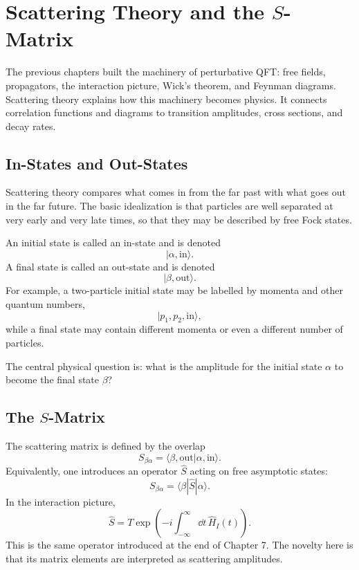 \chapter{Scattering Theory and the \texorpdfstring{\(S\)-Matrix}{S-Matrix}}

\begin{remarkbox}
The previous chapters built the machinery of perturbative QFT: free fields,
propagators, the interaction picture, Wick's theorem, and Feynman diagrams.
Scattering theory explains how this machinery becomes physics. It connects
correlation functions and diagrams to transition amplitudes, cross sections, and
decay rates.
\end{remarkbox}

\section{In-States and Out-States}

Scattering theory compares what comes in from the far past with what goes out in
the far future. The basic idealization is that particles are well separated at
very early and very late times, so that they may be described by free Fock
states.

An initial state is called an in-state and is denoted
\[
    |\alpha,\mathrm{in}\rangle.
\]
A final state is called an out-state and is denoted
\[
    |\beta,\mathrm{out}\rangle.
\]
For example, a two-particle initial state may be labelled by momenta and other
quantum numbers,
\[
    |p_1,p_2,\mathrm{in}\rangle,
\]
while a final state may contain different momenta or even a different number of
particles.

The central physical question is: what is the amplitude for the initial state
\(\alpha\) to become the final state \(\beta\)?

\section{The \texorpdfstring{\(S\)-Matrix}{S-Matrix}}

The scattering matrix is defined by the overlap
\[
    S_{\beta\alpha}
    = \langle\beta,\mathrm{out}|\alpha,\mathrm{in}\rangle.
\]
Equivalently, one introduces an operator \(\hat S\) acting on free asymptotic
states:
\[
    S_{\beta\alpha}
    = \langle\beta|\hat S|\alpha\rangle.
\]
In the interaction picture,
\[
    \hat S
    = T\exp\left(-i\int_{-\infty}^{\infty}\dd t\,\hat H_I(t)\right).
\]
This is the same operator introduced at the end of Chapter 7. The novelty here
is that its matrix elements are interpreted as scattering amplitudes.

